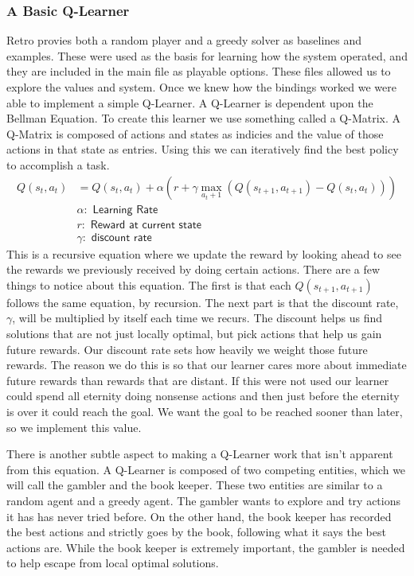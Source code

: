 \documentclass[12pt,letter]{article}
\begin{document}
\subsubsection{A Basic Q-Learner}
Retro provies both a random player and a greedy solver as baselines and examples.
These were used as the basis for learning how the system operated, and they are
included in the main file as playable options. These files allowed us to explore
the values and system. Once we knew how the bindings worked we were able to 
implement a simple Q-Learner. A Q-Learner is dependent upon the Bellman Equation.
To create this learner we use something called a Q-Matrix. A Q-Matrix is composed
of actions and states as indicies and the value of those actions in that state
as entries. Using this we can iteratively find the best policy to accomplish
a task.
\begin{align*}
    Q(s_t,a_t) &= Q(s_t,a_t) + \alpha(r + \gamma \max_{a_t+1}(Q(s_{t+1},a_{t+1}) - Q(s_t,a_t)))\\
    & \alpha: \textsf{ Learning Rate}\\
    & r: \textsf{ Reward at current state}\\
    & \gamma: \textsf{ discount rate}
\end{align*}
This is a recursive equation where we update the reward by looking ahead to see
the rewards we previously received by doing certain actions. There are a few
things to notice about this equation. The first is that each $Q(s_{t+1},a_{t+1})$ 
follows the same equation, by recursion. The next part is that the discount rate,
$\gamma$, will be multiplied by itself each time we recurs. The discount helps
us find solutions that are not just locally optimal, but pick actions that 
help us gain future rewards. Our discount rate sets how heavily we weight those 
future rewards. The reason we do this is so that our learner cares more about
immediate future rewards than rewards that are distant. If this were not used
our learner could spend all eternity doing nonsense actions and then just before
the eternity is over it could reach the goal. We want the goal to be reached
sooner than later, so we implement this value. 

There is another subtle aspect to making a Q-Learner work that isn't apparent
from this equation. A Q-Learner is composed of two competing entities, which
we will call the gambler and the book keeper. These two entities are similar
to a random agent and a greedy agent. The gambler wants to explore and try 
actions it has has never tried before. On the other hand, the book keeper has
recorded the best actions and strictly goes by the book, following what it 
says the best actions are. While the book keeper is extremely important, the 
gambler is needed to help escape from local optimal solutions. 
\end{document}
